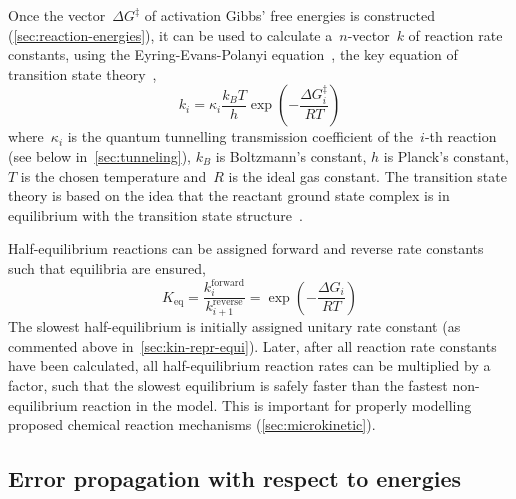 Once the vector~$\Delta G^\ddagger$ of activation Gibbs' free energies is constructed (\cref{sec:reaction-energies}),
it can be used to calculate a~$n$-vector~$k$ of reaction rate constants,
using the Eyring-Evans-Polanyi equation~\cite{Eyring_1935,Evans_1935,TransitionStateTheory},
the key equation of transition state theory~\cite{TransitionStateTheory},
% 
\begin{equation}\label{eq:rate-consts}
	k_i = \kappa_i \frac{k_B T}{h}
	\exp \left(-\frac{\Delta G_i^\ddagger}{R T} \right)
\end{equation}
% 
where~$\kappa_i$ is the quantum tunnelling transmission coefficient of the~$i$-th reaction (see below in~\cref{sec:tunneling}),
$k_B$ is Boltzmann's constant,
$h$ is Planck's constant,
$T$ is the chosen temperature and~$R$ is the ideal gas constant.
The transition state theory is based
on the idea that the reactant ground state complex is in equilibrium
with the transition state structure~\cite{TransitionStateTheory}.

Half-equilibrium reactions can be assigned forward and reverse rate constants such that equilibria are ensured,
% 
\begin{equation}
	K_\text{eq}
	= \frac{k_i^\text{forward}}{k_{i + 1}^\text{reverse}}
	= \exp \left(-\frac{\Delta G_i}{R T} \right)
\end{equation}
% 
The slowest half-equilibrium is initially assigned unitary rate constant (as commented above in~\cref{sec:kin-repr-equi}).
Later,
after all reaction rate constants have been calculated,
all half-equilibrium reaction rates can be multiplied by a factor,
such that the slowest equilibrium is safely faster than the fastest non-equilibrium reaction in the model.
This is important for properly modelling proposed chemical reaction mechanisms (\cref{sec:microkinetic}).

\subsection{Error propagation with respect to energies}%
\label{sec:rates-error-prop}

